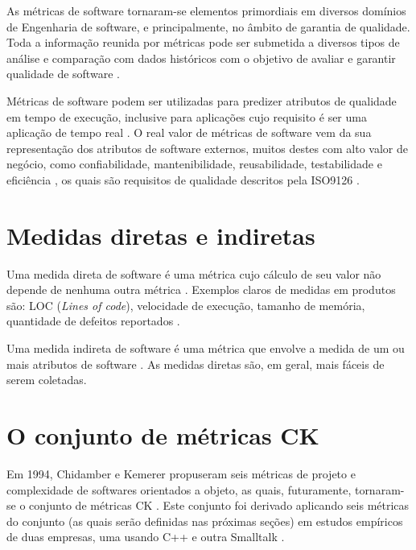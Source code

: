\documentclass[
	12pt,				%
	oneside,			%
	a4paper,			%
	english,			%
	brazil				%
	]{abntex2ppgsi}
\begin{document}
As métricas de software tornaram-se elementos primordiais em diversos domínios de Engenharia de software, e principalmente, no âmbito de garantia de qualidade. Toda a informação reunida por métricas pode ser submetida a diversos tipos de análise e comparação com dados históricos com o objetivo de avaliar e garantir qualidade de software \cite{srivastava2013}. 

Métricas de software podem ser utilizadas para predizer atributos de qualidade em tempo de execução, inclusive para aplicações cujo requisito é ser uma aplicação de tempo real \cite{srivastava2013}. O real valor de métricas de software vem da sua representação dos atributos de software externos, muitos destes com alto valor de negócio, como confiabilidade, mantenibilidade, reusabilidade, testabilidade e eficiência \cite{srivastava2013}, os quais são requisitos de qualidade descritos pela ISO9126 \cite{Zeiss2007}.






\section{Medidas diretas e indiretas}
Uma medida direta de software é uma métrica cujo cálculo de seu valor não depende de nenhuma outra métrica \cite{srivastava2013}. Exemplos claros de medidas em produtos são: LOC (\textit{Lines of code}), velocidade de execução, tamanho de memória, quantidade de defeitos reportados \cite{srivastava2013}.

Uma medida indireta de software é uma métrica que envolve a medida de um ou mais atributos de software \cite{srivastava2013}. As medidas diretas são, em geral, mais fáceis de serem coletadas.


\section{O conjunto de métricas CK}

Em 1994, Chidamber e Kemerer propuseram seis métricas de projeto e complexidade de softwares orientados a objeto, as quais, futuramente, tornaram-se o conjunto de métricas CK \cite{kan95}. Este conjunto foi derivado aplicando seis métricas do conjunto (as quais serão definidas nas próximas seções) em estudos empíricos de duas empresas, uma usando C++ e outra Smalltalk \cite{kan95}.
\end{document}
